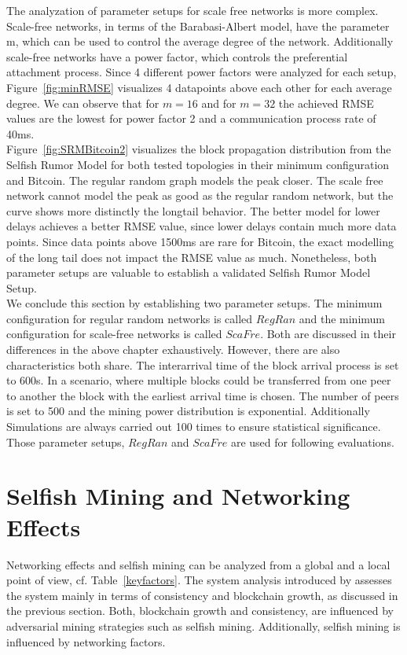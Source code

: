 The analyzation of parameter setups for scale free networks is more complex. Scale-free networks, in terms of the Barabasi-Albert model, have the parameter m, which can be used to control the average degree of the network. Additionally scale-free networks have a power factor, which controls the preferential attachment process. Since 4 different power factors were analyzed for each setup, Figure~\ref{fig:minRMSE} visualizes 4 datapoints above each other for each average degree. We can observe that for $m=16$ and for $m=32$ the achieved RMSE values are the lowest for power factor 2 and a communication process rate of 40ms.\\
Figure~\ref{fig:SRMBitcoin2} visualizes the block propagation distribution from the Selfish Rumor Model for both tested topologies in their minimum configuration and Bitcoin. The regular random graph models the peak closer. The scale free network cannot model the peak as good as the regular random network, but the curve shows more distinctly the longtail behavior. The better model for lower delays achieves a better RMSE value, since lower delays contain much more data points. Since data points above 1500ms are rare for Bitcoin, the exact modelling of the long tail does not impact the RMSE value as much. Nonetheless, both parameter setups are valuable to establish a validated Selfish Rumor Model Setup.\\
We conclude this section by establishing two parameter setups. The minimum configuration for regular random networks is called $RegRan$ and the minimum configuration for scale-free networks is called $ScaFre$. Both are discussed in their differences in the above chapter exhaustively. However, there are also
characteristics both share.
The interarrival time of the block arrival process is set to 600s. In a scenario, where multiple blocks could be transferred from one peer to another the block with the earliest arrival time is chosen. The number of peers is set to 500 and the mining power distribution is exponential. Additionally Simulations are always carried out 100 times to ensure statistical significance.\\
Those parameter setups, $RegRan$ and $ScaFre$ are used for following evaluations.

\section{Selfish Mining and Networking Effects}
Networking effects and selfish mining can be analyzed from a global and a local point of view, cf. Table~\ref{keyfactors}. The system analysis introduced by \gopalan assesses the system mainly in terms of consistency and blockchain growth, as discussed in the previous section. Both, blockchain growth and consistency, are influenced by adversarial mining strategies such as selfish mining. Additionally, selfish mining is influenced by networking factors.

